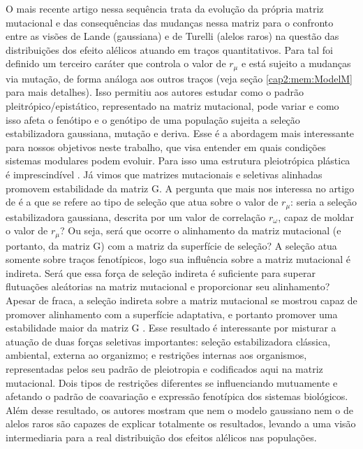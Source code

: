 O mais recente artigo nessa sequência \citep{Jones2007} trata da
evolução da própria matriz mutacional e das consequências das mudanças
nessa matriz para o confronto entre as visões de Lande (gaussiana) e de
Turelli (alelos raros) na questão das distribuições dos efeito alélicos
atuando em traços quantitativos. 
Para tal foi definido um terceiro caráter que controla o valor de
$r_\mu$ e está sujeito a mudanças via mutação, de forma análoga aos
outros traços (veja seção \ref{cap2:mem:ModelM} para mais detalhes). 
Isso permitiu aos autores estudar como o padrão pleitrópico/epistático,
representado na matriz mutacional, pode variar e como isso afeta o
fenótipo e o genótipo de uma população sujeita a seleção estabilizadora
gaussiana, mutação e deriva. 
Esse é a abordagem mais interessante para nossos objetivos neste
trabalho, que visa entender em quais condições sistemas modulares podem
evoluir. 
Para isso uma estrutura pleiotrópica plástica é imprescindível
\citep{Wagner1996, Pavlicev2011a}. 
Já vimos que matrizes mutacionais e seletivas alinhadas promovem
estabilidade da matriz G. 
A pergunta que mais nos interessa no artigo de \cite{Jones2007} é a que
se refere ao tipo de seleção que atua sobre o valor de $r_\mu$: seria a
seleção estabilizadora gaussiana, descrita por um valor de correlação
$r_\omega$, capaz de moldar o valor de $r_\mu$? Ou seja, será que ocorre
o alinhamento da matriz mutacional (e portanto, da matriz G)  com a
matriz da superfície de seleção? A seleção atua somente sobre traços
fenotípicos, logo sua influência sobre a matriz mutacional é indireta. 
Será que essa força de seleção indireta é suficiente para superar
flutuações aleátorias na matriz mutacional e proporcionar seu
alinhamento? Apesar de fraca, a seleção indireta sobre a matriz
mutacional se mostrou capaz de promover alinhamento com a superfície
adaptativa, e portanto promover uma estabilidade maior da matriz G
\citep{Jones2007}. 
Esse resultado é interessante por misturar a atuação de duas forças
seletivas importantes: seleção estabilizadora clássica, ambiental,
externa ao organizmo; e restrições internas aos organismos,
representadas pelos seu padrão de pleiotropia e codificados aqui na
matriz mutacional. 
Dois tipos de restrições diferentes se influenciando mutuamente e
afetando o padrão de coavariação e expressão fenotípica dos sistemas
biológicos. 
Além desse resultado, os autores mostram que nem o modelo gaussiano nem
o de alelos raros são capazes de explicar totalmente os resultados,
levando a uma visão intermediaria para a real distribuição dos efeitos
alélicos nas populações.

